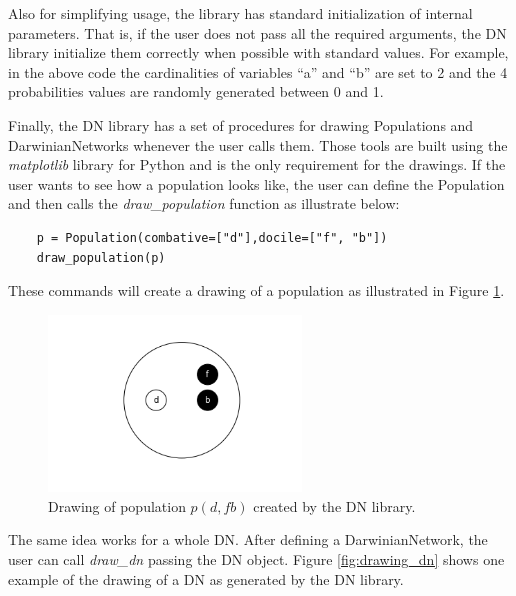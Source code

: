 Also for simplifying usage, the library has standard initialization of internal parameters.
That is, if the user does not pass all the required arguments, the DN library initialize them correctly when possible with standard values.
For example, in the above code the cardinalities of variables ``a'' and ``b'' are set to 2 and the 4 probabilities values are randomly generated between 0 and 1.

Finally, the DN library has a set of procedures for drawing Populations and DarwinianNetworks whenever the user calls them.
Those tools are built using the \emph{matplotlib} \cite{Hunter:2007} library for Python and is the only requirement for the drawings.
If the user wants to see how a population looks like, the user can define the Population and then calls the \emph{draw\_population} function as illustrate below:
\begin{verbatim}
    p = Population(combative=["d"],docile=["f", "b"])
    draw_population(p)
\end{verbatim}
These commands will create a drawing of a population as illustrated in Figure \ref{fig:drawing_pop}.

\begin{figure}[hbt]
    \begin{center}
        \includegraphics[width=0.6\textwidth]{img/drawing_population.png}
    \end{center}
    \caption{Drawing of population $p(d,fb)$ created by the DN library.}
    \label{fig:drawing_pop}
\end{figure}

The same idea works for a whole DN.
After defining a DarwinianNetwork, the user can call \emph{draw\_dn} passing the DN object.
Figure \ref{fig:drawing_dn} shows one example of the drawing of a DN as generated by the DN library.

